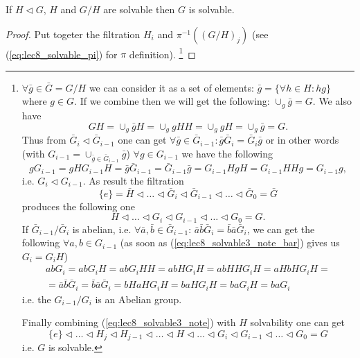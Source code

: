 \begin{property}
  If $H \triangleleft G$, $H$ and $G/H$ are solvable then $G$ is
  solvable.
  \label{property:lec8_solvable3}
  \begin{proof}
    Put togeter the filtration $H_i$ and
    $\pi^{-1}\left(\left(G/H\right)_j\right)$ (see
    (\ref{eq:lec8_solvable_pi}) for $\pi$ definition).
    \footnote{
      $\forall \bar{g} \in \bar{G} = G/H$ we can consider it as a set
      of elements: $\bar{g} = \{\forall h \in H: h g\}$ where
      $g \in G$.
      If we combine then we will get the following: $\cup_g \bar{g} =
      G$.
      We also have
      \begin{equation}
        G H = \cup_g \bar{g} H =
        \cup_g g H H = \cup_g g H = \cup_g \bar{g} = G.
        \label{eq:lec8_solvable3_note_bar}
      \end{equation}
      Thus from $\bar{G}_i \triangleleft \bar{G}_{i - 1}$ one can
      get $\forall \bar{g} \in \bar{G}_{i - 1}: \bar{g} \bar{G}_i =
      \bar{G}_i \bar{g}$ or in other words
      (with $G_{i - 1} = \cup_{\bar{g} \in \bar{G}_{i - 1}} \bar{g}$)
      $\forall g \in G_{i - 1}$ we have the following
      \[
      g G_{i - 1} = g H G_{i - 1} H =
      \bar{g} \bar{G}_{i-1} =
      \bar{G}_{i-1} \bar{g} =
      G_{i - 1} H g H =
      G_{i - 1} H H g = G_{i - 1} g,
      \]
      i.e.
      ${G}_i \triangleleft {G}_{i - 1}$.
      As result the filtration
      \[
      \{e\} = \bar{H} \triangleleft \dots \triangleleft
      \bar{G}_i \triangleleft \bar{G}_{i - 1} \triangleleft \dots
      \triangleleft \bar{G}_0 = \bar{G} 
      \]
      produces the following one
      \begin{equation}
      H \triangleleft \dots \triangleleft
      G_i \triangleleft G_{i - 1} \triangleleft \dots
      \triangleleft G_0 = G.
      \label{eq:lec8_solvable3_note}
      \end{equation}
      If $\bar{G}_{i - 1}/\bar{G}_{i}$ is abelian, i.e.
      $\forall \bar{a},\bar{b} \in \bar{G}_{i - 1}$:
      $\bar{a} \bar{b} \bar{G}_{i} = \bar{b} \bar{a} \bar{G}_{i}$, we
      can get the following
      $\forall a, b \in G_{i-1}$ (as soon as
      (\ref{eq:lec8_solvable3_note_bar}) gives us $G_i = G_i H$)
      \begin{eqnarray}
      a b G_i = a b G_i H = a b G_i H H =
      a b H G_i H = a b H H G_i H = a H b H G_i H =
      \nonumber \\
      =
      \bar{a} \bar{b} \bar{G}_{i} = \bar{b} \bar{a} \bar{G}_{i} =
      b H a H G_i H = b a H G_i H = b a G_i H = b a G_i
      \nonumber
      \end{eqnarray}
      i.e. the  $G_{i-1}/G_i$ is an Abelian
      group.

      Finally combining (\ref{eq:lec8_solvable3_note}) with $H$
      solvability one can get
      \[
      \{e\} \triangleleft \dots
      \triangleleft
      H_j \triangleleft H_{j - 1} \triangleleft \dots
      \triangleleft H
      \triangleleft \dots \triangleleft
      G_i \triangleleft G_{i - 1} \triangleleft \dots
      \triangleleft G_0 = G
      \]
      i.e. $G$ is solvable.
    }
  \end{proof}
\end{property}

